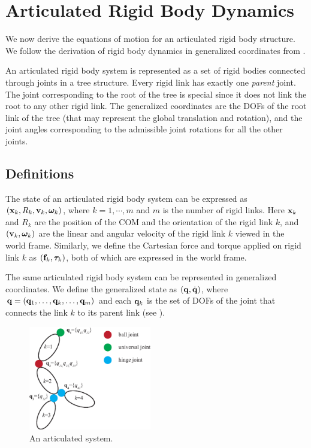 \section{Articulated Rigid Body Dynamics}
We now derive the equations of motion for an articulated rigid body structure. We follow the derivation of rigid body dynamics in generalized coordinates from .

An articulated rigid body system is represented as a set of rigid bodies connected through joints in a tree structure. Every rigid link has exactly one \emph{parent} joint. The joint corresponding to the root of the tree is special since it does not link the root to any other rigid link. The generalized coordinates are the DOFs of the root link of the tree (that may represent the global translation and rotation), and the joint angles corresponding to the admissible joint rotations for all the other joints. 

\subsection{Definitions}
The state of an articulated rigid body
system can be expressed as $(\mathbf{x}_k, R_k, \mathbf{v}_k,
\boldsymbol{\bm{\omega}}_k)$, where $k = 1, \cdots, m$ and $m$ is the number of rigid links. Here $\mathbf{x}_k$ and
$R_k$ are the position of the COM and the orientation of the rigid link $k$, and $(\mathbf{v}_k,
{\bm{\omega}}_k)$ are the linear and angular velocity of the
rigid link $k$ viewed in the world frame. Similarly, we define the
Cartesian force and torque applied on rigid link $k$ as $(\mathbf{f}_k,
{\bm{\tau}}_k)$, both of which are expressed in the world
frame.

The same articulated rigid body system can be represented in
generalized coordinates. We define the generalized state as $(\mathbf{q},\dot{\mathbf{q}})$, where $\mathbf{q} = (\mathbf{q}_1,\hdots,\mathbf{q}_k,\hdots,\mathbf{q}_m)$ and each $\mathbf{q}_k$ is the set of DOFs of the joint that connects the link $k$ to its parent link (see ). 

\begin{figure}
 \vspace{20pt}
\begin{center}
\includegraphics[width=2.1in]{example1_new.eps}
\end{center}
\caption{An articulated system.}
 \vspace{0pt}
\label{fig:example1}
\end{figure}

